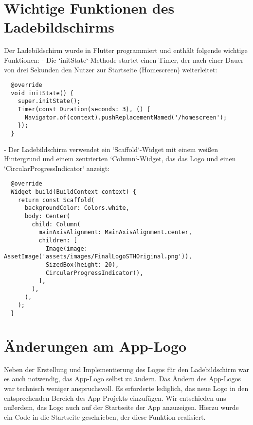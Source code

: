 \section*{Wichtige Funktionen des Ladebildschirms}
Der Ladebildschirm wurde in Flutter programmiert und enthält folgende wichtige Funktionen:\newline
- Die `initState`-Methode startet einen Timer, der nach einer Dauer von drei Sekunden den Nutzer zur Startseite (Homescreen) weiterleitet:
\begin{verbatim}
  @override
  void initState() {
    super.initState();
    Timer(const Duration(seconds: 3), () {
      Navigator.of(context).pushReplacementNamed('/homescreen');
    });
  }
\end{verbatim}
- Der Ladebildschirm verwendet ein `Scaffold`-Widget mit einem weißen Hintergrund und einem zentrierten `Column`-Widget, das das Logo und einen `CircularProgressIndicator` anzeigt:
\begin{verbatim}
  @override
  Widget build(BuildContext context) {
    return const Scaffold(
      backgroundColor: Colors.white,
      body: Center(
        child: Column(
          mainAxisAlignment: MainAxisAlignment.center,
          children: [
            Image(image: AssetImage('assets/images/FinalLogoSTHOriginal.png')),
            SizedBox(height: 20),
            CircularProgressIndicator(),
          ],
        ),
      ),
    );
  }
\end{verbatim}

\section*{Änderungen am App-Logo}
Neben der Erstellung und Implementierung des Logos für den Ladebildschirm war es auch notwendig, das App-Logo selbst zu ändern. Das Ändern des App-Logos war technisch weniger anspruchsvoll. Es erforderte lediglich, das neue Logo in den entsprechenden Bereich des App-Projekts einzufügen. \newline
Wir entschieden uns außerdem, das Logo auch auf der Startseite der App anzuzeigen. Hierzu wurde ein Code in die Startseite geschrieben, der diese Funktion realisiert.
